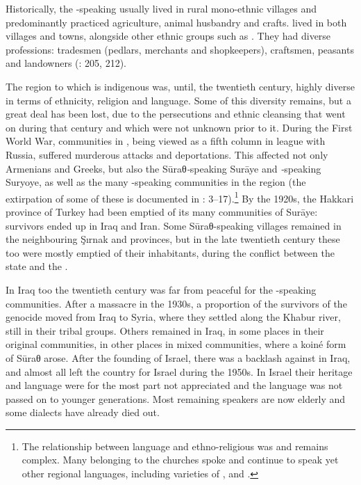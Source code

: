 \documentclass[output=paper]{langsci/langscibook}
\begin{document}
Historically, the -speaking  usually lived in rural mono-ethnic villages and predominantly practiced agriculture, animal husbandry and crafts.  lived in both villages and towns, alongside other ethnic groups such as . They had diverse professions: tradesmen (pedlars, merchants and shopkeepers), craftsmen, peasants and landowners (\citealt{BrauerPatai1993}: 205, 212).

The region to which  is indigenous was, until, the twentieth century, highly diverse in terms of ethnicity, religion and language. Some of this diversity remains, but a great deal has been lost, due to the persecutions and ethnic cleansing that went on during that century and which were not unknown prior to it. During the First World War,  communities in , being viewed as a fifth column in league with Russia, suffered murderous attacks and deportations. This affected not only Armenians and Greeks, but also the Sūraθ\textit{{}-}speaking Surāye and \textit{{}-}speaking Suryoye, as well as the many -speaking  communities in the region (the extirpation of some of these is documented in \citealt{Jastrow1978}: 3–17).\footnote{The relationship between language and ethno-religious  was and remains complex. Many  belonging to the  churches spoke and continue to speak yet other regional languages, including varieties of ,  and .} By the 1920s, the Hakkari province of Turkey had been emptied of its many communities of Surāye: survivors ended up in Iraq and Iran. Some Sūraθ-speaking villages remained in the neighbouring Şırnak and  provinces, but in the late twentieth century these too were mostly emptied of their inhabitants, during the conflict between the  state and the .

In Iraq too the twentieth century was far from peaceful for the -speaking communities. After a massacre in the 1930s, a proportion of the survivors of the genocide moved from Iraq to Syria, where they settled along the Khabur river, still in their tribal groups. Others remained in Iraq, in some places in their original communities, in other places in mixed communities, where a koiné form of Sūraθ arose. After the founding of Israel, there was a backlash against  in Iraq, and almost all  left the country for Israel during the 1950s. In Israel their heritage and language were for the most part not appreciated and the language was not passed on to younger generations. Most remaining speakers are now elderly and some dialects have already died out.
\end{document}
